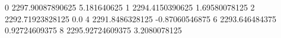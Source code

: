 0 2297.90087890625 5.181640625
1 2294.4150390625 1.69580078125
2 2292.71923828125 0.0
4 2291.8486328125 -0.87060546875
6 2293.646484375 0.92724609375
8 2295.92724609375 3.2080078125
